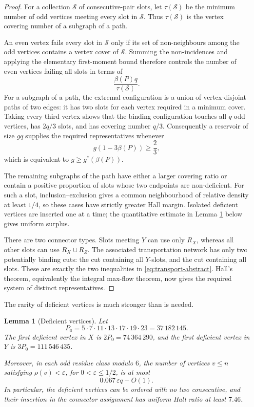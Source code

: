 \documentclass{article}
\newtheorem{lemma}[theorem]{Lemma}
\theoremstyle{remark}
\begin{document}
\begin{proof}
For a collection \(\mathcal S\) of consecutive-pair slots, let
\(\tau(\mathcal S)\) be the minimum number of odd vertices meeting
every slot in \(\mathcal S\). Thus \(\tau(\mathcal S)\) is the vertex
covering number of a subgraph of a path.

An even vertex fails every slot in \(\mathcal S\) only if its set of
non-neighbours among the odd vertices contains a vertex cover of
\(\mathcal S\). Summing the non-incidences and applying the elementary
first-moment bound therefore controls the number of even vertices
failing all slots in terms of
\[
 \frac{\beta(P)q}{\tau(\mathcal S)}.
\]
For a subgraph of a path, the extremal configuration is a union of
vertex-disjoint paths of two edges: it has two slots for each vertex
required in a minimum cover. Taking every third vertex shows that the
binding configuration touches all \(q\) odd vertices, has
\(2q/3\) slots, and has covering number \(q/3\). Consequently a
reservoir of size \(gq\) supplies the required representatives whenever
\[
 g(1-3\beta(P))\geq\frac23,
\]
which is equivalent to \(g\geq g^\ast(\beta(P))\).

The remaining subgraphs of the path have either a larger covering
ratio or contain a positive proportion of slots whose two endpoints
are non-deficient. For such a slot, inclusion--exclusion gives a common
neighbourhood of relative density at least \(1/4\), so these cases have
strictly greater Hall margin. Isolated deficient vertices are inserted
one at a time; the quantitative estimate in Lemma
\ref{lem:deficient} below gives uniform surplus.

There are two connector types. Slots meeting \(Y\) can use only \(R_X\),
whereas all other slots can use \(R_X\cup R_Z\). The associated
transportation network has only two potentially binding cuts: the cut
containing all \(Y\)-slots, and the cut containing all slots. These are
exactly the two inequalities in \eqref{eq:transport-abstract}.
Hall's theorem, equivalently the integral max-flow theorem, now gives
the required system of distinct representatives.
\end{proof}

The rarity of deficient vertices is much stronger than is needed.

\begin{lemma}[Deficient vertices]\label{lem:deficient}
Let
\[
 P_0=5\cdot7\cdot11\cdot13\cdot17\cdot19\cdot23
     =37\,182\,145.
\]
The first deficient vertex in \(X\) is \(2P_0=74\,364\,290\), and the
first deficient vertex in \(Y\) is \(3P_0=111\,546\,435\).

Moreover, in each odd residue class modulo \(6\), the number of
vertices \(v\leq n\) satisfying \(\rho(v)<\varepsilon\), for
\(0<\varepsilon\leq1/2\), is at most
\[
 0.067\,\varepsilon q+O(1).
\]
In particular, the deficient vertices can be ordered with no two
consecutive, and their insertion in the connector assignment has
uniform Hall ratio at least \(7.46\).
\end{lemma}
\end{document}
